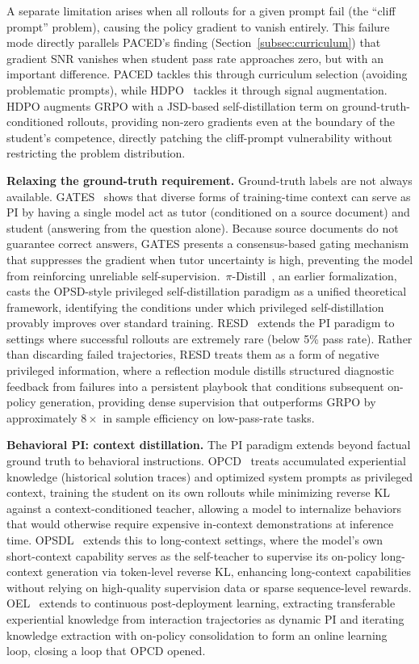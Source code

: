 \documentclass{article} %
\begin{document}
A separate limitation arises when all rollouts for a given prompt fail (the ``cliff prompt'' problem), causing the policy gradient to vanish entirely. This failure mode directly parallels PACED's finding (Section~\ref{subsec:curriculum}) that gradient SNR vanishes when student pass rate approaches zero, but with an important difference. PACED tackles this through curriculum selection (avoiding problematic prompts), while HDPO~\citep{2603.23871} tackles it through signal augmentation. HDPO augments GRPO with a JSD-based self-distillation term on ground-truth-conditioned rollouts, providing non-zero gradients even at the boundary of the student's competence, directly patching the cliff-prompt vulnerability without restricting the problem distribution.

\textbf{Relaxing the ground-truth requirement.} Ground-truth labels are not always available. GATES~\citep{2602.20574} shows that diverse forms of training-time context can serve as PI by having a single model act as tutor (conditioned on a source document) and student (answering from the question alone). Because source documents do not guarantee correct answers, GATES presents a consensus-based gating mechanism that suppresses the gradient when tutor uncertainty is high, preventing the model from reinforcing unreliable self-supervision.~$\pi$-Distill~\citep{2602.04942}, an earlier formalization, casts the OPSD-style privileged self-distillation paradigm as a unified theoretical framework, identifying the conditions under which privileged self-distillation provably improves over standard training. RESD~\citep{2605.12741} extends the PI paradigm to settings where successful rollouts are extremely rare (below 5\% pass rate). Rather than discarding failed trajectories, RESD treats them as a form of negative privileged information, where a reflection module distills structured diagnostic feedback from failures into a persistent playbook that conditions subsequent on-policy generation, providing dense supervision that outperforms GRPO by approximately $8\times$ in sample efficiency on low-pass-rate tasks.

\textbf{Behavioral PI: context distillation.} The PI paradigm extends beyond factual ground truth to behavioral instructions. OPCD~\citep{2602.12275} treats accumulated experiential knowledge (historical solution traces) and optimized system prompts as privileged context, training the student on its own rollouts while minimizing reverse KL against a context-conditioned teacher, allowing a model to internalize behaviors that would otherwise require expensive in-context demonstrations at inference time. OPSDL~\citep{2604.17535} extends this to long-context settings, where the model's own short-context capability serves as the self-teacher to supervise its on-policy long-context generation via token-level reverse KL, enhancing long-context capabilities without relying on high-quality supervision data or sparse sequence-level rewards. OEL~\citep{2603.16856} extends to continuous post-deployment learning, extracting transferable experiential knowledge from interaction trajectories as dynamic PI and iterating knowledge extraction with on-policy consolidation to form an online learning loop, closing a loop that OPCD opened.
\end{document}
